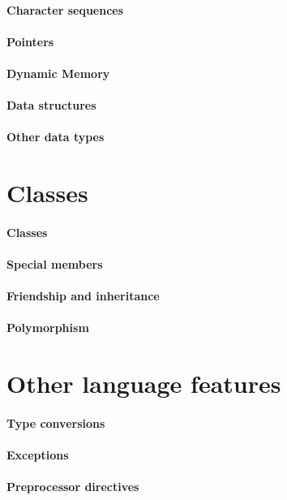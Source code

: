 \documentclass{beamer}
\begin{document}
\subsection{Character sequences}
\subsection{Pointers}
\subsection{Dynamic Memory}
\subsection{Data structures}
\subsection{Other data types}

\part{Classes}
\subsection{Classes}
\subsection{Special members}
\subsection{Friendship and inheritance}
\subsection{Polymorphism}

\part{Other language features}
\subsection{Type conversions}
\subsection{Exceptions}
\subsection{Preprocessor directives}
\end{document}
